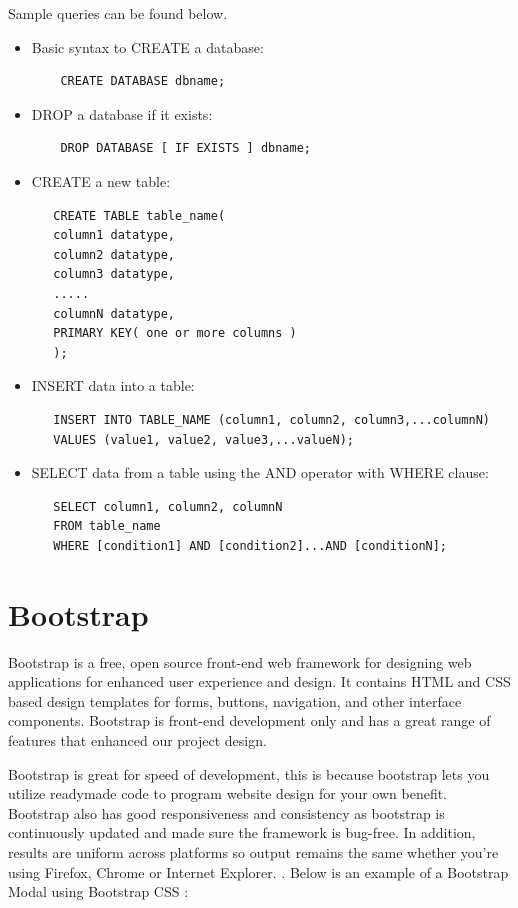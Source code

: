 Sample queries can be found below.
\begin{itemize}
\item Basic syntax to CREATE a database:
\begin{verbatim}
    CREATE DATABASE dbname;
\end{verbatim}

\item DROP a database if it exists:
\begin{verbatim}
    DROP DATABASE [ IF EXISTS ] dbname;
\end{verbatim}

\item CREATE a new table:
\begin{verbatim}
   CREATE TABLE table_name(
   column1 datatype,
   column2 datatype,
   column3 datatype,
   .....
   columnN datatype,
   PRIMARY KEY( one or more columns )
   );
\end{verbatim}

\item INSERT data into a table:
\begin{verbatim}
   INSERT INTO TABLE_NAME (column1, column2, column3,...columnN)
   VALUES (value1, value2, value3,...valueN);
\end{verbatim}

\item SELECT data from a table using the AND operator with WHERE clause:
\begin{verbatim}
   SELECT column1, column2, columnN
   FROM table_name
   WHERE [condition1] AND [condition2]...AND [conditionN];
\end{verbatim}
\end{itemize}

\section{Bootstrap}
Bootstrap is a free, open source front-end web framework for designing web applications for enhanced user experience and design. It contains HTML and CSS based design templates for forms, buttons, navigation, and other interface components. Bootstrap is front-end development only and has a great range of features that enhanced our project design\cite{Bootstrap}. \par Bootstrap is great for speed of development, this is because bootstrap lets you utilize readymade code to program website design for your own benefit. Bootstrap also has good responsiveness and consistency as bootstrap is continuously updated and made sure the framework is bug-free. In addition, results are uniform across platforms so output remains the same whether you’re using Firefox, Chrome or Internet Explorer. \cite{ChristopherGimmer}. Below is an example of a Bootstrap Modal using Bootstrap CSS \cite{BootstrapModals}:

